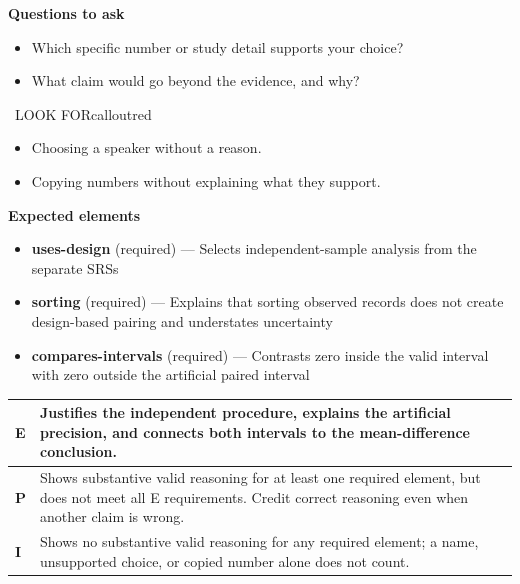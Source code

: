\documentclass[11pt]{article}
\begin{document}
\textbf{Questions to ask}
\begin{itemize}[leftmargin=1.5em,itemsep=2pt,topsep=2pt]
  \item Which specific number or study detail supports your choice?
  \item What claim would go beyond the evidence, and why?
\end{itemize}

\begin{callout}{\IconWarn\ LOOK FOR}{calloutred}
\begin{itemize}[leftmargin=1.5em,itemsep=2pt,topsep=2pt]
  \item Choosing a speaker without a reason.
  \item Copying numbers without explaining what they support.
\end{itemize}
\end{callout}


\textbf{Expected elements}
\begin{itemize}[leftmargin=1.5em,itemsep=2pt,topsep=2pt]
  \item \textbf{uses-design} (required) --- Selects independent-sample analysis from the separate SRSs
  \item \textbf{sorting} (required) --- Explains that sorting observed records does not create design-based pairing and understates uncertainty
  \item \textbf{compares-intervals} (required) --- Contrasts zero inside the valid interval with zero outside the artificial paired interval
\end{itemize}

{\small\renewcommand{\arraystretch}{1.25}
\noindent\begin{tabular}{|p{0.5in}|p{5.9in}|}
\hline
\textbf{E} & Justifies the independent procedure, explains the artificial precision, and connects both intervals to the mean-difference conclusion. \\ \hline
\textbf{P} & Shows substantive valid reasoning for at least one required element, but does not meet all E requirements. Credit correct reasoning even when another claim is wrong. \\ \hline
\textbf{I} & Shows no substantive valid reasoning for any required element; a name, unsupported choice, or copied number alone does not count. \\ \hline
\end{tabular}}
\end{document}
